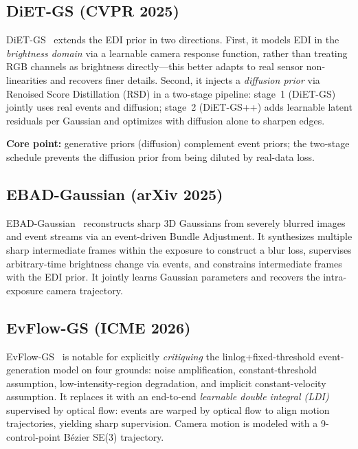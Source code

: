 \subsection{DiET-GS (CVPR 2025)}
\label{sec:deblur:dietgs}

DiET-GS~\cite{lee2025dietgs} extends the EDI prior in two directions. First, it models EDI in the \emph{brightness domain} via a learnable camera response function, rather than treating RGB channels as brightness directly---this better adapts to real sensor non-linearities and recovers finer details. Second, it injects a \emph{diffusion prior} via Renoised Score Distillation (RSD) in a two-stage pipeline: stage~1 (DiET-GS) jointly uses real events and diffusion; stage~2 (DiET-GS++) adds learnable latent residuals per Gaussian and optimizes with diffusion alone to sharpen edges.

\textbf{Core point:} generative priors (diffusion) complement event priors; the two-stage schedule prevents the diffusion prior from being diluted by real-data loss.

\subsection{EBAD-Gaussian (arXiv 2025)}
\label{sec:deblur:ebad}

EBAD-Gaussian~\cite{deng2025ebad} reconstructs sharp 3D Gaussians from severely blurred images and event streams via an event-driven Bundle Adjustment. It synthesizes multiple sharp intermediate frames within the exposure to construct a blur loss, supervises arbitrary-time brightness change via events, and constrains intermediate frames with the EDI prior. It jointly learns Gaussian parameters and recovers the intra-exposure camera trajectory.

\subsection{EvFlow-GS (ICME 2026)}
\label{sec:deblur:evflowgs}

EvFlow-GS~\cite{an2026evflow} is notable for explicitly \emph{critiquing} the linlog+fixed-threshold event-generation model on four grounds: noise amplification, constant-threshold assumption, low-intensity-region degradation, and implicit constant-velocity assumption. It replaces it with an end-to-end \emph{learnable double integral (LDI)} supervised by optical flow: events are warped by optical flow to align motion trajectories, yielding sharp supervision. Camera motion is modeled with a 9-control-point B\'ezier SE(3) trajectory.

